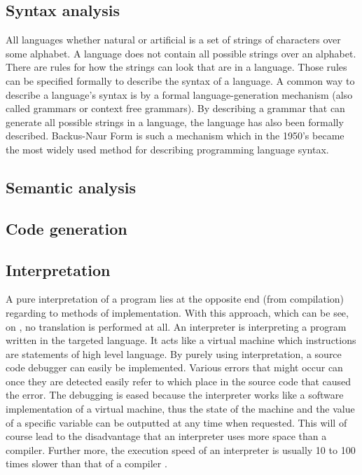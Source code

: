 \subsection{Syntax analysis}
All languages whether natural or artificial is a set of strings of characters over some alphabet. A language does not contain all possible strings over an alphabet. There are rules for how the strings can look that are in a language. Those rules can be specified formally to describe the syntax of a language\cite[p. 135]{sebesta2013}. A common way to describe a language's syntax is by a formal language-generation mechanism (also called grammars or context free grammars). By describing a grammar that can generate all possible strings in a language, the language has also been formally described. Backus-Naur Form is such a mechanism which in the 1950's became the most widely used method for describing programming language syntax\cite[p. 137]{sebesta2013}.

\begin{ebnf}
\galt{\gter{>}}
\galt{\gter{<}}
\end{ebnf}


\subsection{Semantic analysis}
\subsection{Code generation}
\subsection{Interpretation}

A pure interpretation of a program lies at the opposite end (from compilation) regarding to methods of implementation. With this approach, which can be see, on , no translation is performed at all. An interpreter is interpreting a program written in the targeted language. It acts like a virtual machine which instructions are statements of high level language. By purely using interpretation, a source code debugger can easily be implemented. Various errors that might occur can once they are detected easily refer to which place in the source code that caused the error. The debugging is eased because the interpreter works like a software implementation of a virtual machine, thus the state of the machine and the value of a specific variable can be outputted at any time when requested. This will of course lead to the disadvantage that an interpreter uses more space than a compiler. Further more, the execution speed of an interpreter is usually 10 to 100 times slower than that of a compiler \cite[p. 48]{sebesta2013}.

